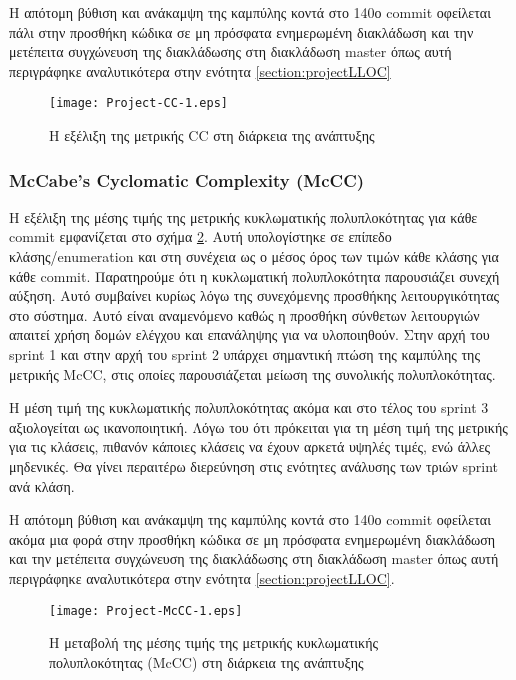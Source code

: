 Η απότομη βύθιση και ανάκαμψη της καμπύλης κοντά στο 140ο commit
οφείλεται πάλι στην προσθήκη κώδικα σε μη πρόσφατα ενημερωμένη
διακλάδωση και την μετέπειτα συγχώνευση της διακλάδωσης στη
διακλάδωση master όπως αυτή περιγράφηκε αναλυτικότερα
στην ενότητα \ref{section:projectLLOC}

\begin{figure}
\centering
\texttt{[image: Project-CC-1.eps]}
\caption{Η εξέλιξη της μετρικής CC στη διάρκεια της ανάπτυξης}
\label{fig:projectCC}
\end{figure}

\subsubsection{McCabe’s Cyclomatic Complexity (McCC)}

Η εξέλιξη της μέσης τιμής της μετρικής κυκλωματικής πολυπλοκότητας για
κάθε commit εμφανίζεται στο σχήμα \ref{fig:projectMcCC}. Αυτή υπολογίστηκε σε
επίπεδο κλάσης/enumeration και στη συνέχεια ως ο μέσος όρος των τιμών
κάθε κλάσης για κάθε commit. Παρατηρούμε ότι η κυκλωματική πολυπλοκότητα
παρουσιάζει συνεχή αύξηση. Αυτό συμβαίνει κυρίως λόγω της συνεχόμενης
προσθήκης λειτουργικότητας στο σύστημα. Αυτό είναι αναμενόμενο καθώς η
προσθήκη σύνθετων λειτουργιών απαιτεί χρήση δομών ελέγχου και επανάληψης
για να υλοποιηθούν. Στην αρχή του sprint 1 και στην αρχή του sprint 2
υπάρχει σημαντική πτώση της καμπύλης της μετρικής McCC, στις οποίες
παρουσιάζεται μείωση της συνολικής πολυπλοκότητας.

Η μέση τιμή της κυκλωματικής πολυπλοκότητας ακόμα και στο τέλος του
sprint 3 αξιολογείται ως ικανοποιητική. Λόγω του ότι πρόκειται για τη
μέση τιμή της μετρικής για τις κλάσεις, πιθανόν κάποιες κλάσεις να έχουν
αρκετά υψηλές τιμές, ενώ άλλες μηδενικές. Θα γίνει περαιτέρω διερεύνηση
στις ενότητες ανάλυσης των τριών sprint ανά κλάση.

Η απότομη βύθιση και ανάκαμψη της καμπύλης κοντά στο 140ο commit
οφείλεται ακόμα μια φορά στην προσθήκη κώδικα σε μη πρόσφατα ενημερωμένη
διακλάδωση και την μετέπειτα συγχώνευση της διακλάδωσης στη διακλάδωση
master όπως αυτή περιγράφηκε αναλυτικότερα στην ενότητα
\ref{section:projectLLOC}.

\begin{figure}
\centering
\texttt{[image: Project-McCC-1.eps]}
\caption{Η μεταβολή της μέσης τιμής της μετρικής κυκλωματικής
	πολυπλοκότητας (McCC) στη διάρκεια της ανάπτυξης}
\label{fig:projectMcCC}
\end{figure}

